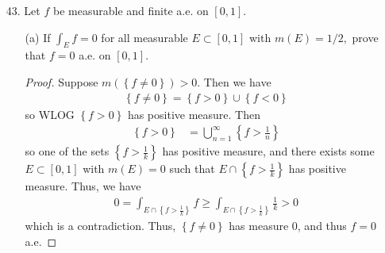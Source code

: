 \documentclass{article}
\begin{document}
\begin{itemize}
	\item[43.]  Let $f$ be measurable and finite a.e. on $[0, 1].$
		\begin{itemize}
			\item[(a)] If $\int_E f=0$ for all measurable $E\subset[0, 1]$ with $m(E)=1/2,$ prove that $f=0$ a.e. on $[0, 1].$
				\begin{proof}
					Suppose $m\left( \left\{ f\neq 0 \right\} \right)>0.$ Then we have
					\begin{align*}
						\left\{ f\neq 0 \right\} = \left\{ f>0 \right\}\cup \left\{ f<0 \right\}
					\end{align*}
					so WLOG $\left\{ f>0 \right\}$ has positive measure. Then
					\begin{align*}
						\left\{ f>0 \right\} &= \bigcup_{n=1}^\infty\left\{ f > \frac{1}{n} \right\}
					\end{align*} 
					so one of the sets $\left\{ f>\frac{1}{k} \right\}$ has positive measure, and there exists some $E\subset[0, 1]$ with $m(E)=0$ such that $E\cap \left\{ f>\frac{1}{k} \right\}$ has positive measure. Thus, we have
					\begin{align*}
						0 = \int_{E\cap\left\{ f>\frac{1}{k} \right\}}f \ge \int_{E\cap \left\{ f>\frac{1}{k} \right\}}\frac{1}{k} > 0
					\end{align*}
					which is a contradiction. Thus, $\left\{ f\neq 0 \right\}$ has measure 0, and thus $f=0$ a.e.
				\end{proof}
				
		\end{itemize}
		
\end{itemize}
\end{document}
